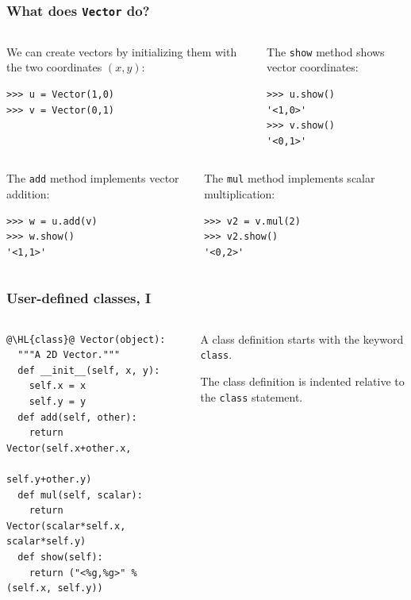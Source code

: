 \documentclass[english,serif,mathserif,xcolor=pdftex,dvipsnames,table]{beamer}
\begin{document}
\begin{frame}[fragile]
  \frametitle{What does \texttt{Vector} do?}
  \begin{columns}
    \begin{column}[t]{0.5\linewidth}
  We can create vectors by initializing them with the two coordinates
  $(x,y)$:
\begin{lstlisting}
>>> u = Vector(1,0)
>>> v = Vector(0,1)
\end{lstlisting}
    \end{column}
    \begin{column}[t]{0.5\linewidth}
      The \texttt{show} method shows vector coordinates:
\begin{lstlisting}
>>> u.show()
'<1,0>'
>>> v.show()
'<0,1>'
\end{lstlisting}
    \end{column}
  \end{columns}

  \+
  \begin{columns}
    \begin{column}[t]{0.5\linewidth}
      The \texttt{add} method implements vector addition:
\begin{lstlisting}
>>> w = u.add(v)
>>> w.show()
'<1,1>'
\end{lstlisting}
    \end{column}
    \begin{column}[t]{0.5\linewidth}
      The \texttt{mul} method implements scalar multiplication:
\begin{lstlisting}
>>> v2 = v.mul(2)
>>> v2.show()
'<0,2>'
\end{lstlisting}
    \end{column}
  \end{columns}
\end{frame}


\begin{frame}[fragile]
  \frametitle{User-defined classes, I}
  \begin{columns}[t]
    \begin{column}{0.5\textwidth}
\begin{lstlisting}
@\HL{class}@ Vector(object):
  """A 2D Vector."""
  def __init__(self, x, y):
    self.x = x
    self.y = y
  def add(self, other):
    return Vector(self.x+other.x,
                  self.y+other.y)
  def mul(self, scalar):
    return Vector(scalar*self.x, scalar*self.y)
  def show(self):
    return ("<%g,%g>" % (self.x, self.y))
\end{lstlisting}
    \end{column}
    \begin{column}{0.5\textwidth}
      \raggedleft
      A class definition starts with the keyword \texttt{class}.

      The class definition is indented relative to the \texttt{class}
      statement.
    \end{column}
  \end{columns}
\end{frame}
\end{document}
